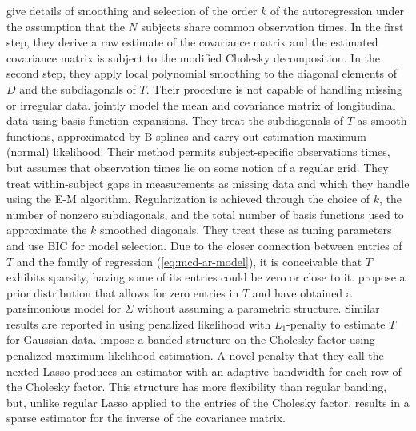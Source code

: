 \cite{wu2003nonparametric} give details of smoothing and selection of the order $k$ of the autoregression under the assumption that the $N$ subjects share common observation times.  In the first step, they derive a raw estimate of the covariance matrix and the estimated covariance matrix is subject to the modified Cholesky decomposition. In the second step, they apply local polynomial smoothing to the diagonal elements of $D$ and the subdiagonals of $T$. Their procedure is not capable of handling missing or irregular data. \cite{huang2007estimation} jointly model the mean and covariance matrix of longitudinal data using basis function expansions. They treat the subdiagonals of $T$ as smooth functions, approximated by B-splines and carry out estimation maximum (normal) likelihood. Their method permits subject-specific observations times, but assumes that observation times lie on some notion of a regular grid. They treat within-subject gaps in measurements as missing data and which they handle using the E-M algorithm. Regularization is achieved through the choice of $k$, the number of nonzero subdiagonals, and the total number of basis functions used to approximate the $k$ smoothed diagonals. They treat these as tuning parameters and use BIC for model selection. Due to the closer connection between entries of $T$ and the family of regression (\ref{eq:mcd-ar-model}), it is conceivable that $T$  exhibits sparsity, having some of its entries could be zero or close to it. \cite{smith2002parsimonious} propose a prior distribution that allows for zero entries in $T$ and have obtained a parsimonious model for $\Sigma$ without assuming a parametric structure. Similar results are reported in \cite{huang2006covariance} using penalized likelihood with $L_1$-penalty to estimate $T$ for Gaussian data. \cite{levina2008sparse} impose a banded structure on the Cholesky factor using penalized maximum likelihood estimation. A novel penalty that they call the nexted Lasso produces an estimator with an adaptive bandwidth for each row of the Cholesky factor. This structure has more flexibility than regular banding, but, unlike regular Lasso applied to the entries of the Cholesky factor, results in a sparse estimator for the inverse of the covariance matrix.
 
 \bigskip
 
